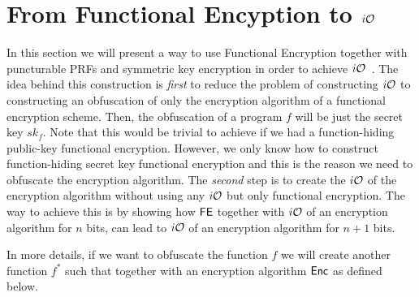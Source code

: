 \section{From Functional Encyption to $i\mathcal{O}$}

In this section we will present a way to use Functional Encryption together with puncturable PRFs and symmetric key encryption in order to achieve $i\mathcal{O}$~\cite{iO-FE}. The idea behind this construction is \emph{first} to reduce the problem of constructing $i\mathcal{O}$ to constructing an obfuscation of only the encryption algorithm of a functional encryption scheme. Then, the obfuscation of a program $f$ will be just the secret key $sk_f$. Note that this would be trivial to achieve if we had a function-hiding public-key functional encryption. However, we only know how to construct function-hiding secret key functional encryption and this is the reason we need to obfuscate the encryption algorithm. The \emph{second} step is to create the $i\mathcal{O}$ of the encryption algorithm without using any $i\mathcal{O}$ but only functional encryption. The way to achieve this is by showing how $\mathsf{FE}$ together with $i\mathcal{O}$ of an encryption algorithm for $n$ bits, can lead to $i\mathcal{O}$ of an encryption algorithm for $n+1$ bits.

In more details, if we want to obfuscate the function $f$ we will create another function $f^*$ such that together with an encryption algorithm $\mathsf{Enc}$ as defined below.
\begin{figure}[h!]
\centering
{}
\end{figure}
\begin{figure}[h!]
\centering
{}
\end{figure}

